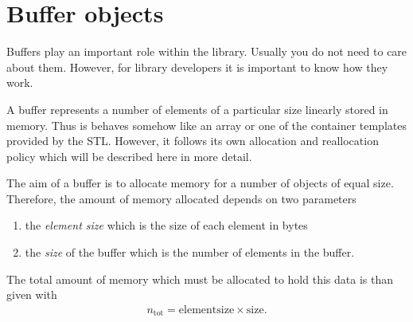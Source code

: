 
\section{Buffer objects}
Buffers play an important role within the library. Usually you do not need 
to care about them. However, for library developers it is important 
to know how they work.

A buffer represents a number of elements of a particular size linearly 
stored in memory. Thus is behaves somehow like an array or one of the 
container templates provided by the STL. However, it follows its own 
allocation and reallocation policy which will be described here in more detail.  

The aim of a buffer is to allocate memory for a number of objects of equal 
size. Therefore, the amount of memory allocated depends on two parameters
\begin{enumerate}
  \item the {\em element size } which is the size of each element in bytes
  \item the {\em size } of the buffer which is the number of elements in the
  buffer.
\end{enumerate}
The total amount of memory which must be allocated to hold this data is 
than given with
\begin{align}
n_{\mathrm{tot}} = \mathrm{element size}\times\mathrm{size}.
\end{align}

